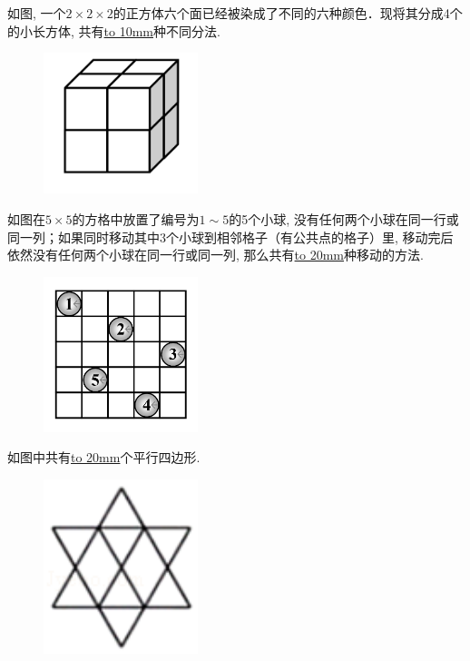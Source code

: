 \item {
    如图, 一个$2\times 2\times 2$的正方体六个面已经被染成了不同的六种颜色．现将其分成4个 的小长方体, 共有\underline{\hbox to 10mm{}}种不同分法.
    \begin{figure}[H] 
        \centering
        \includegraphics[width=0.4\textwidth]{./pics/Chapter_6/15.png}
    \end{figure}
}

\item {
    如图在$5\times 5$的方格中放置了编号为$1\sim 5$的5个小球, 没有任何两个小球在同一行或同一列；如果同时移动其中3个小球到相邻格子（有公共点的格子）里, 移动完后依然没有任何两个小球在同一行或同一列, 那么共有\underline{\hbox to 20mm{}}种移动的方法.
    \begin{figure}[H] 
        \centering
        \includegraphics[width=0.4\textwidth]{./pics/Chapter_6/23.png}
    \end{figure}
}


\item {
    如图中共有\underline{\hbox to 20mm{}}个平行四边形.
    \begin{figure}[H] 
        \centering
        \includegraphics[width=0.4\textwidth]{./pics/Chapter_6/2017_1.png}
    \end{figure}
}

